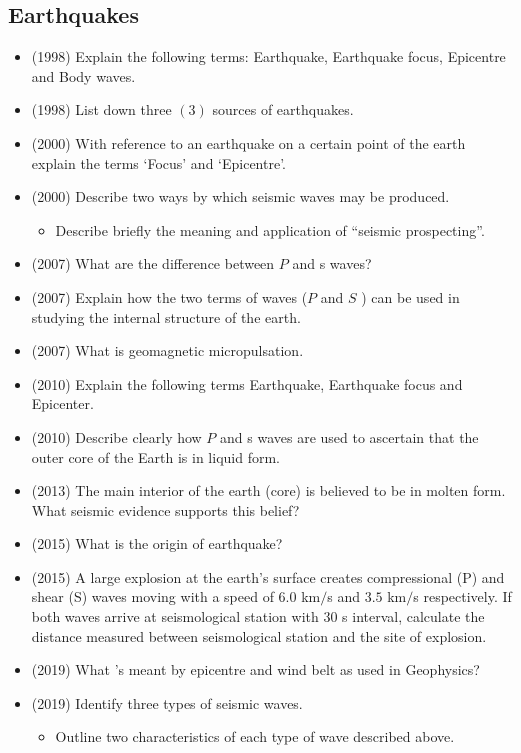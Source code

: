 \documentclass{article}
\begin{document}
\subsection{Earthquakes}
\begin{itemize}
\item (1998)  Explain the following terms: Earthquake, Earthquake focus, Epicentre and Body waves.
\item (1998)  List down three $ (3)$ sources of earthquakes.
\item (2000)  With reference to an earthquake on a certain point of the earth explain the terms ‘Focus’ and ‘Epicentre’.
\item (2000)  Describe two ways by which seismic waves may be produced.
 \begin{itemize}
\item Describe briefly the meaning and application of “seismic prospecting”. 
\end{itemize}
\item (2007)  What are the difference between $ P$ and s waves?
\item (2007)  Explain how the two terms of waves ($ P$ and $ S$ ) can be used in studying the internal structure of the earth. 
\item (2007)  What is geomagnetic micropulsation.
\item (2010)  Explain the following terms Earthquake, Earthquake focus and Epicenter.
\item (2010)  Describe clearly how $ P$ and s waves are used to ascertain that the outer core of the Earth is in liquid form. 
\item (2013)  The main interior of the earth (core) is believed to be in molten form. What seismic evidence supports this belief?
\item (2015)  What is the origin of earthquake?
\item (2015)  A large explosion at the earth's surface creates compressional (P) and shear (S) waves moving with a speed of $ 6.0$ km$/$s and $ 3.5$ km$/$s respectively. If both waves arrive at seismological station with $ 30$ s interval, calculate the distance measured between seismological station and the site of explosion. 
\item (2019)  What 's meant by epicentre and wind belt as used in Geophysics? 
\item (2019)  Identify three types of seismic waves.
 \begin{itemize}
\item Outline two characteristics of each type of wave described above.
\end{itemize}
\end{itemize}
\end{document}
